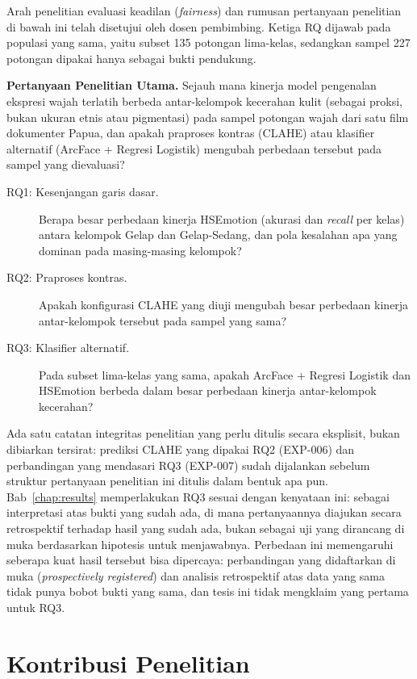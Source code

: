 Arah penelitian evaluasi keadilan (\textit{fairness}) dan rumusan pertanyaan penelitian di bawah ini telah disetujui oleh dosen pembimbing. Ketiga RQ dijawab pada populasi yang sama, yaitu subset 135 potongan lima-kelas, sedangkan sampel 227 potongan dipakai hanya sebagai bukti pendukung.

\textbf{Pertanyaan Penelitian Utama.} Sejauh mana kinerja model pengenalan ekspresi wajah terlatih berbeda antar-kelompok kecerahan kulit (sebagai proksi, bukan ukuran etnis atau pigmentasi) pada sampel potongan wajah dari satu film dokumenter Papua, dan apakah praproses kontras (CLAHE) atau klasifier alternatif (ArcFace + Regresi Logistik) mengubah perbedaan tersebut pada sampel yang dievaluasi?

\begin{description}
  \item[RQ1: Kesenjangan garis dasar.] Berapa besar perbedaan kinerja HSEmotion (akurasi dan \textit{recall} per kelas) antara kelompok Gelap dan Gelap-Sedang, dan pola kesalahan apa yang dominan pada masing-masing kelompok?
  \item[RQ2: Praproses kontras.] Apakah konfigurasi CLAHE yang diuji mengubah besar perbedaan kinerja antar-kelompok tersebut pada sampel yang sama?
  \item[RQ3: Klasifier alternatif.] Pada subset lima-kelas yang sama, apakah ArcFace + Regresi Logistik dan HSEmotion berbeda dalam besar perbedaan kinerja antar-kelompok kecerahan?
\end{description}

Ada satu catatan integritas penelitian yang perlu ditulis secara eksplisit, bukan dibiarkan tersirat: prediksi CLAHE yang dipakai RQ2 (EXP-006) dan perbandingan yang mendasari RQ3 (EXP-007) sudah dijalankan sebelum struktur pertanyaan penelitian ini ditulis dalam bentuk apa pun. Bab~\ref{chap:results} memperlakukan RQ3 sesuai dengan kenyataan ini: sebagai interpretasi atas bukti yang sudah ada, di mana pertanyaannya diajukan secara retrospektif terhadap hasil yang sudah ada, bukan sebagai uji yang dirancang di muka berdasarkan hipotesis untuk menjawabnya. Perbedaan ini memengaruhi seberapa kuat hasil tersebut bisa dipercaya: perbandingan yang didaftarkan di muka (\textit{prospectively registered}) dan analisis retrospektif atas data yang sama tidak punya bobot bukti yang sama, dan tesis ini tidak mengklaim yang pertama untuk RQ3.

\section{Kontribusi Penelitian}
\label{sec:contributions}

